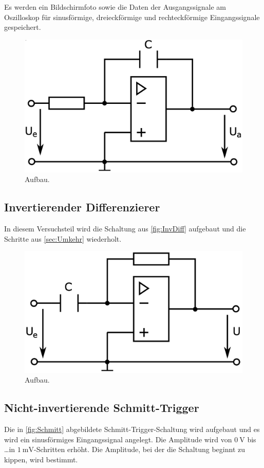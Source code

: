 Es werden ein Bildschirmfoto sowie die Daten der Ausgangssignale am Oszilloskop für sinusförmige, dreieckförmige und rechteckförmige Eingangssignale gespeichert.

\begin{figure}
    \centering
    \includegraphics[width=0.7\linewidth]{./figures/2_Umkehr.png}
    \caption{Aufbau. \cite{Anleitung}}
    \label{fig:Umkehr}
\end{figure}


\subsection{Invertierender Differenzierer}
In diesem Versuchsteil wird die Schaltung aus \autoref{fig:InvDiff} aufgebaut und die Schritte aus \autoref{sec:Umkehr} wiederholt.

\begin{figure}
    \centering
    \includegraphics[width=0.7\linewidth]{./figures/3_InvDiff.png}
    \caption{Aufbau. \cite{Anleitung}}
    \label{fig:InvDiff}
\end{figure}


\subsection{Nicht-invertierende Schmitt-Trigger}
\label{sec:Schmitt}
Die in \autoref{fig:Schmitt} abgebildete Schmitt-Trigger-Schaltung wird aufgebaut und es wird ein sinusförmiges Eingangssignal angelegt. Die Amplitude wird von $\SI{0}{\volt}$ bis \dots in $\SI{1}{\milli\volt}$-Schritten erhöht. %
Die Amplitude, bei der die Schaltung beginnt zu kippen, wird bestimmt.

